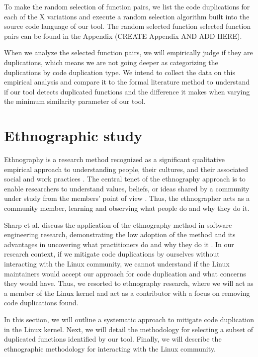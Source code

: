 To make the random selection of function pairs, we list the code duplications for each of the 
X variations and execute a random selection algorithm built into the source code language of 
our tool. The random selected function selected function pairs can 
be found in the Appendix (CREATE Appendix AND ADD HERE).

When we analyze the selected function pairs, we will empirically judge if they are duplications,
which means we are not going deeper as categorizing the duplications by code duplication type. 
We intend to collect the data on this empirical analysis and compare it to the formal literature 
method to understand if our tool detects duplicated functions and the difference it makes when 
varying the minimum similarity parameter of our tool.

\section{Ethnographic study}

Ethnography is a research method recognized as a significant qualitative empirical approach to 
understanding people, their cultures, and their associated social and work practices \citep{bookethno}.
The central tenet of the ethnography approach is to enable researchers to understand values, 
beliefs, or ideas shared by a community under study from the members’ point of view 
\citep{ethnosoft}. Thus, the ethnographer acts as a community member, learning and observing 
what people do and why they do it.

Sharp et al. discuss the application of the ethnography method in software engineering research, 
demonstrating the low adoption of the method and its advantages in uncovering what practitioners 
do and why they do it \citep{ethnosoft}. In our research context, if we mitigate code 
duplications by ourselves without interacting with the Linux community, we cannot understand if 
the Linux maintainers would accept our approach for code duplication and what concerns they 
would have. Thus, we resorted to ethnography research, where we will act as a member of the 
Linux kernel and act as a contributor with a focus on removing code duplications found.

In this section, we will outline a systematic approach to mitigate code duplication in the 
Linux kernel. Next, we will detail the methodology for selecting a subset of duplicated functions 
identified by our tool. Finally, we will describe the ethnographic methodology for interacting 
with the Linux community.


